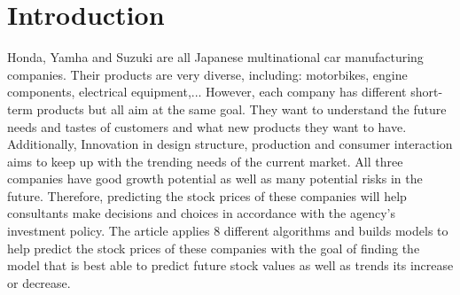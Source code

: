 \documentclass{ieeeojies}
\begin{document}
\section{Introduction}
\label{sec:introduction}
Honda, Yamha and Suzuki are all Japanese multinational car manufacturing companies. Their products are very diverse, including: motorbikes, engine components, electrical equipment,... However, each company has different short-term products but all aim at the same goal. They want to understand the future needs and tastes of customers and what new products they want to have. Additionally, Innovation in design structure, production and consumer interaction aims to keep up with the trending needs of the current market. All three companies have good growth potential as well as many potential risks in the future. Therefore, predicting the stock prices of these companies will help consultants make decisions and choices in accordance with the agency's investment policy. The article applies 8 different algorithms and builds models to help predict the stock prices of these companies with the goal of finding the model that is best able to predict future stock values as well as trends its increase or decrease.
\end{document}
